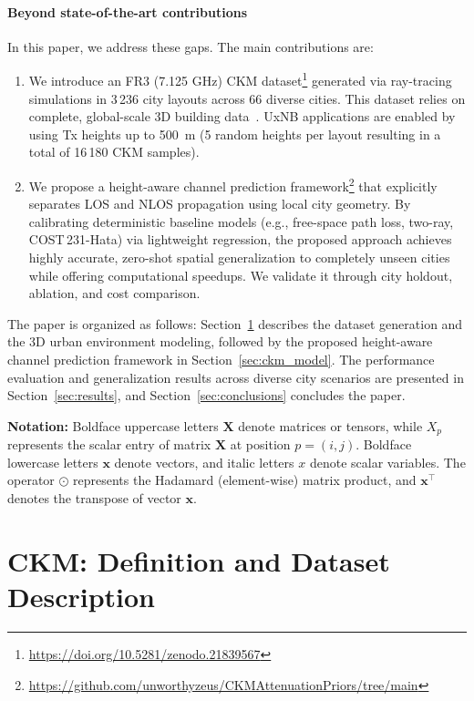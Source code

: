 \documentclass[10pt,conference,letterpaper]{IEEEtran}
\begin{document}
\paragraph{Beyond state-of-the-art contributions}
In this paper, we address these gaps. The main contributions are:
\begin{enumerate}
    \item We introduce an FR3 (7.125 GHz) CKM dataset\footnote{\url{https://doi.org/10.5281/zenodo.21839567}} generated via ray-tracing simulations in 3\,236 city layouts across 66 diverse cities. This dataset relies on complete, global-scale 3D building data~\cite{Che2024globfp,Zhu2025atlas}. UxNB applications are enabled by using Tx heights up to \SI{500}{m} (5 random heights per layout resulting in a total of 16\,180 CKM samples). 
    \item We propose a height-aware channel prediction framework\footnote{\url{https://github.com/unworthyzeus/CKMAttenuationPriors/tree/main}} that explicitly separates LOS and NLOS propagation using local city geometry. By calibrating deterministic baseline models (e.g., free-space path loss, two-ray, COST\,231-Hata) via lightweight regression, the proposed approach achieves highly accurate, zero-shot spatial generalization to completely unseen cities while offering computational speedups. We validate it through city holdout, ablation, and cost comparison.
\end{enumerate}

    
The paper is organized as follows: Section~\ref{sec:ckm_dataset} describes the dataset generation and the 3D urban environment modeling, followed by the proposed height-aware channel prediction framework in Section~\ref{sec:ckm_model}. The performance evaluation and generalization results across diverse city scenarios are presented in Section~\ref{sec:results}, and Section~\ref{sec:conclusions} concludes the paper.

\textbf{Notation:} Boldface uppercase letters $\mathbf{X}$ denote matrices or tensors, while ${X}_{p}$ represents the scalar entry of matrix $\mathbf{X}$ at position $p = (i, j)$. Boldface lowercase letters $\mathbf{x}$ denote vectors, and italic letters $x$ denote scalar variables. The operator $\odot$ represents the Hadamard (element-wise) matrix product, and $\mathbf{x}^\top$ denotes the transpose of vector $\mathbf{x}$.

\section{CKM: Definition and Dataset Description}
\label{sec:ckm_dataset}
\end{document}
